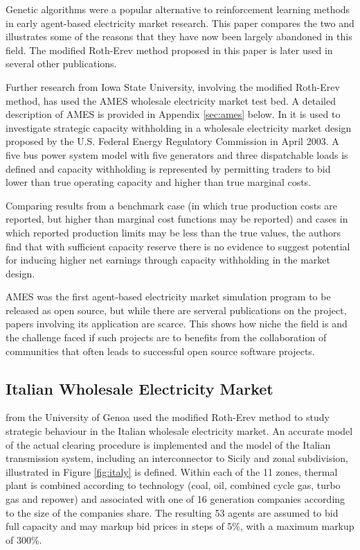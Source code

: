 Genetic algorithms were a popular alternative to reinforcement learning methods
in early agent-based electricity market research.  This paper compares the two
and illustrates some of the reasons that they have now been largely abandoned
in this field. The modified Roth-Erev method proposed in this paper is later
used in several other publications.

Further research from Iowa State University, involving the modified Roth-Erev
method, has used the AMES wholesale electricity market test bed.  A
detailed description of AMES is provided in Appendix \ref{sec:ames} below.  In
 it is used to investigate strategic capacity
withholding in a wholesale electricity market design proposed by the U.S.
Federal Energy Regulatory Commission in April 2003.  A five bus power system model
with five generators and three dispatchable loads is defined and capacity
withholding is represented by permitting traders to bid lower than true
operating capacity and higher than true marginal costs.

Comparing results from a benchmark case (in which true production costs are
reported, but higher than marginal cost functions may be reported) and cases in
which reported production limits may be less than the true values, the authors
find that with sufficient capacity reserve there is no evidence to suggest
potential for inducing higher net earnings through capacity withholding in the
market design.

AMES was the first agent-based electricity market simulation program to be
released as open source, but while there are serveral publications on the
project, papers involving its application are scarce.  This shows how
niche the field is and the challenge faced if such projects are to benefits
from the collaboration of communities that often leads to successful open
source software projects.

\subsection{Italian Wholesale Electricity Market}

%

 from the University of Genoa used the modified
Roth-Erev method to study strategic behaviour in the Italian wholesale electricity market.  An accurate model of the actual clearing procedure is
implemented and the model of the Italian transmission system, including an
interconnector to Sicily and zonal subdivision, illustrated in Figure
\ref{fig:italy} is defined.  Within each of the 11 zones, thermal plant is
combined according to technology (coal, oil, combined cycle gas, turbo gas and
repower) and associated with one of 16 generation companies according to the
size of the companies share.  The resulting 53 agents are assumed to bid full
capacity and may markup bid prices in steps of 5\%, with a maximum markup of
300\%.

